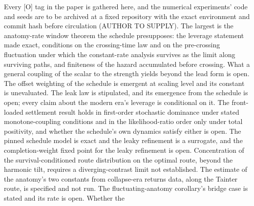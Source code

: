 Every [O] tag in the paper is gathered here, and the numerical
experiments' code and seeds are to be archived at a fixed repository
with the exact environment and commit hash before circulation (AUTHOR
TO SUPPLY). The largest is the
anatomy-rate window theorem the schedule presupposes: the leverage
statement made exact, conditions on the crossing-time law and on the
pre-crossing fluctuation under which the constant-rate analysis survives
as the limit along surviving paths, and finiteness of the hazard
accumulated before crossing. What a general coupling of the scalar to the
strength yields beyond the lead form is open. The
offset weighting of the schedule is emergent at scaling level and its
constant is unevaluated. The leak law is stipulated, and its emergence
from the schedule is open; every claim about the modern era's leverage
is conditional on it. The front-loaded settlement result holds in first-order stochastic
dominance under stated monotone-coupling conditions and in the
likelihood-ratio order only under total positivity, and whether the
schedule's own dynamics satisfy either is open. The pinned schedule
model is exact and the leaky refinement is a surrogate, and the
completion-weight fixed point for the leaky refinement is open.
Concentration of the survival-conditioned route distribution on the
optimal route, beyond the harmonic tilt, requires a diverging-contrast
limit not established. The estimate
of the anatomy's two constants from collapse-era returns data, along the
Tainter route, is specified and not run. The fluctuating-anatomy
corollary's bridge case is stated and its rate is open. Whether the
